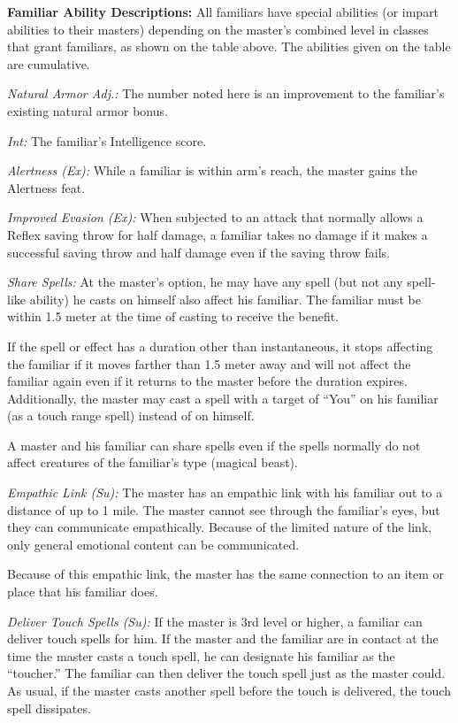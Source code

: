 \textbf{Familiar Ability Descriptions:} All familiars have special abilities (or impart abilities to their masters) depending on the master's combined level in classes that grant familiars, as shown on the table above. The abilities given on the table are cumulative.

\textit{Natural Armor Adj.:} The number noted here is an improvement to the familiar's existing natural armor bonus.

\textit{Int:} The familiar's Intelligence score.

\textit{Alertness (Ex):} While a familiar is within arm's reach, the master gains the Alertness feat.

\textit{Improved Evasion (Ex):} When subjected to an attack that normally allows a Reflex saving throw for half damage, a familiar takes no damage if it makes a successful saving throw and half damage even if the saving throw fails.

\textit{Share Spells:} At the master's option, he may have any spell (but not any spell-like ability) he casts on himself also affect his familiar. The familiar must be within 1.5 meter at the time of casting to receive the benefit.

If the spell or effect has a duration other than instantaneous, it stops affecting the familiar if it moves farther than 1.5 meter away and will not affect the familiar again even if it returns to the master before the duration expires. Additionally, the master may cast a spell with a target of ``You'' on his familiar (as a touch range spell) instead of on himself.

A master and his familiar can share spells even if the spells normally do not affect creatures of the familiar's type (magical beast).

\textit{Empathic Link (Su):} The master has an empathic link with his familiar out to a distance of up to 1 mile. The master cannot see through the familiar's eyes, but they can communicate empathically. Because of the limited nature of the link, only general emotional content can be communicated.

Because of this empathic link, the master has the same connection to an item or place that his familiar does.

\textit{Deliver Touch Spells (Su):} If the master is 3rd level or higher, a familiar can deliver touch spells for him. If the master and the familiar are in contact at the time the master casts a touch spell, he can designate his familiar as the ``toucher.'' The familiar can then deliver the touch spell just as the master could. As usual, if the master casts another spell before the touch is delivered, the touch spell dissipates.

